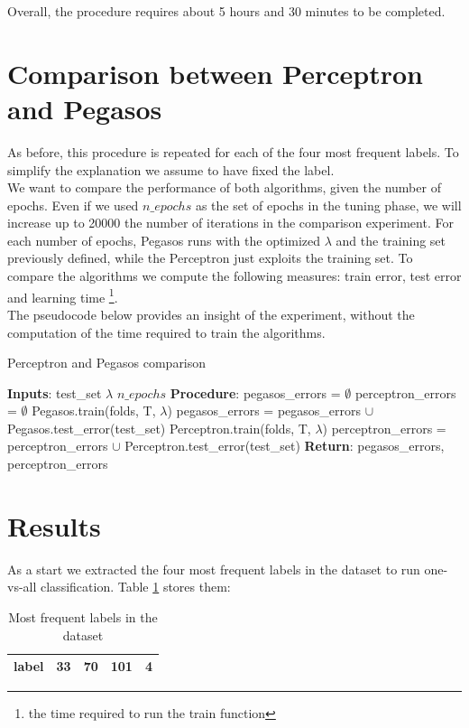 \documentclass{article}
\begin{document}
\noindent  Overall, the procedure requires about 5 hours and 30 minutes to be completed.

\section{Comparison between Perceptron and Pegasos} \label{Comparison}
As before, this procedure is repeated for each of the four most frequent labels. To simplify the explanation we assume to have fixed the label. \\
We want to compare the performance of both algorithms, given the number of epochs. Even if we used  $n\_epochs$ as the set of epochs in the tuning phase, we will increase up to 20000 the number of iterations in the comparison experiment.
For each number of epochs, Pegasos runs with the optimized $\lambda$ and the training set previously defined, while the Perceptron just exploits the training set. To compare the algorithms we compute the following measures: train error, test error and learning time \footnote{the time required to run the train function}.\\
The pseudocode below provides an insight of the experiment, without the computation of the time required to train the algorithms. 
\begin{algorithm} [H]
   \caption{Perceptron and Pegasos comparison}
    \begin{algorithmic}[1]
     \State \textbf{Inputs}: 
        \State test\_set 
        \State  $\lambda$ 
        \State $n\_epochs$ 
    \State \textbf{Procedure}: 
	\State  pegasos\_errors = $\emptyset$
	\State  perceptron\_errors = $\emptyset$
 	    	\State Pegasos.train(folds, T, $\lambda$) 
 	    	\State pegasos\_errors = pegasos\_errors $\cup$ Pegasos.test\_error(test\_set)
     	  	\State Perceptron.train(folds, T, $\lambda$)
 	    	\State  perceptron\_errors = perceptron\_errors $\cup$ Perceptron.test\_error(test\_set)
 	    \EndFor
        \State \textbf{Return}: pegasos\_errors, perceptron\_errors
\end{algorithmic}
\end{algorithm}

\section{Results} \label{Results}
As a start we extracted the four most frequent labels in the dataset to run one-vs-all classification. Table \ref{table labels} stores them:
\begin{table}[H]
\begin{center}
 \begin{tabular}{||c | c |  c | c| c||} 
 \hline label & 33 & 70 & 101 & 4 \\ [0.5ex] 
    \hline
\end{tabular}
\caption{Most frequent labels in the dataset}
\label{table labels}
\end{center}
\end{table}
\end{document}
